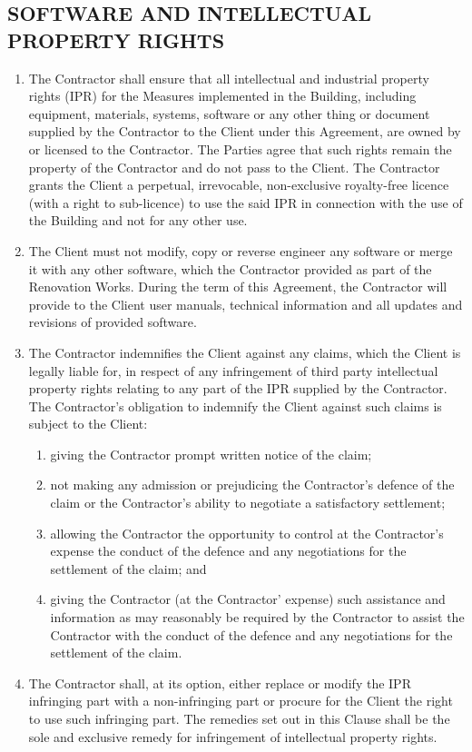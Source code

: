 \begin{multicols}{2}
\subsection{SOFTWARE AND INTELLECTUAL PROPERTY RIGHTS}
\begin{enumerate}
	\item	The Contractor shall ensure that all intellectual and industrial property rights (IPR) for the Measures implemented in the Building, including equipment, materials, systems, software or any other thing or document supplied by the Contractor to the Client under this Agreement, are owned by or licensed to the Contractor. The Parties agree that such rights remain the property of the Contractor and do not pass to the Client. The Contractor grants the Client a perpetual, irrevocable, non-exclusive royalty-free licence (with a right to sub-licence) to use the said IPR in connection with the use of the Building and not for any other use.
	\item	The Client must not modify, copy or reverse engineer any software or merge it with any other software, which the Contractor provided as part of the Renovation Works. During the term of this Agreement, the Contractor will provide to the Client user manuals, technical information and all updates and revisions of provided software.
	\item	The Contractor indemnifies the Client against any claims, which the Client is legally liable for, in respect of any infringement of third party intellectual property rights relating to any part of the IPR supplied by the Contractor. The Contractor’s obligation to indemnify the Client against such claims is subject to the Client:
	\begin{enumerate}
		\item	giving the Contractor prompt written notice of the claim;
		\item	not making any admission or prejudicing the Contractor’s defence of the claim or the Contractor’s ability to negotiate a satisfactory settlement;
		\item	allowing the Contractor the opportunity to control at the Contractor’s expense the conduct of the defence and any negotiations for the settlement of the claim; and
		\item	giving the Contractor (at the Contractor’ expense) such assistance and information as may reasonably be required by the Contractor to assist the Contractor with the conduct of the defence and any negotiations for the settlement of the claim.
	\end{enumerate}
	\item	The Contractor shall, at its option, either replace or modify the IPR infringing part with a non-infringing part or procure for the Client the right to use such infringing part. The remedies set out in this Clause shall be the sole and exclusive remedy for infringement of intellectual property rights.
\end{enumerate}


\end{multicols}
